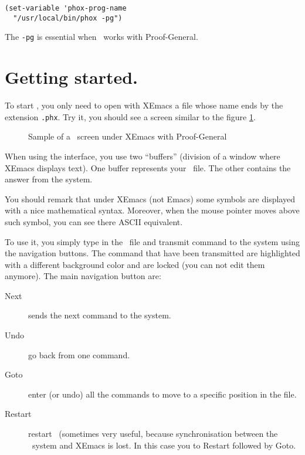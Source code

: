 \begin{verbatim}
(set-variable 'phox-prog-name
  "/usr/local/bin/phox -pg")
\end{verbatim}

The \verb#-pg# is essential when \AFD\ works with Proof-General.


\section{Getting started.}

To start \AFD, you only need to open with XEmacs a file whose name ends by the
extension \verb#.phx#. Try it, you should see a screen similar to the
figure \ref{ecran}.

\begin{figure}
\htmlimage{}
\begin{latexonly}
\hspace{-2cm}
\end{latexonly}

\caption{Sample of a \AFD\ screen under XEmacs with Proof-General}\label{ecran}
\end{figure}


When using the interface, you use two ``buffers'' (division of a
window where XEmacs displays text). One buffer represents your \AFD\
file. The other contains the answer from the system.

You should remark that under XEmacs (not Emacs) some symbols are
displayed with a nice mathematical syntax. Moreover, when the mouse
pointer moves above such symbol, you can see there ASCII equivalent.

To use it, you simply type in the \AFD\ file and transmit command to
the system using the navigation buttons. The command that have been
transmitted are highlighted with a different background color and are
locked (you can not edit them anymore). The main navigation button are:

\begin{description}
\item[Next] sends the next command to the system.
\item[Undo] go back from one command.
\item[Goto] enter (or undo) all the commands to move to a specific
position in the file.
\item[Restart] restart \AFD\ (sometimes very useful, because
synchronisation between the \AFD\ system and XEmacs is lost. In this
case you to Restart followed by Goto.
\end{description}

